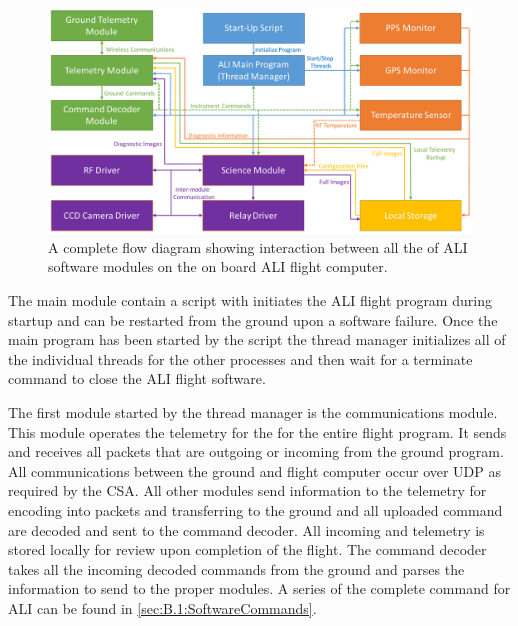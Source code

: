 \begin{figure}
        \centering
        \includegraphics[width=1.0\textwidth]{./Images/3-3-SoftwareFlowDiagram.pdf}
        \caption[ALI Software Flow Diagram]{A complete flow diagram showing interaction between all the of ALI software modules on the on board ALI flight computer.}
        \label{fig:3.3:softwareFlowDiagram}
\end{figure}

The main module contain a script with initiates the ALI flight program during startup and can be restarted from the ground upon a software failure. Once the main program has been started by the script the thread manager initializes all of the individual threads for the other processes and then wait for a terminate command to close the ALI flight software.

The first module started by the thread manager is the communications module. This module operates the telemetry for the for the entire flight program. It sends and receives all packets that are outgoing or incoming from the ground program. All communications between the ground and flight computer occur over UDP as required by the CSA. All other modules send information to the telemetry for encoding into packets and transferring to the ground and all uploaded command are decoded and sent to the command decoder. All incoming and telemetry is stored locally for review upon completion of the flight. The command decoder takes all the incoming decoded commands from the ground and parses the information to send to the proper modules. A series of the complete command for ALI can be found in \autoref{sec:B.1:SoftwareCommands}.

